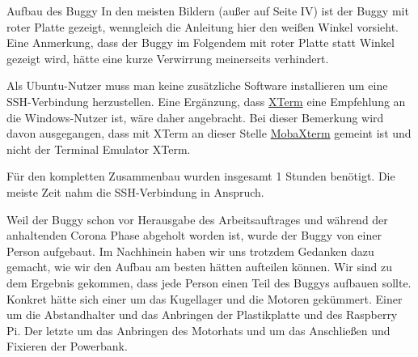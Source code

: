\documentclass[12pt,twoside]{report}
\begin{document}
\begin{section}{Aufbau des Buggy}
In den meisten Bildern (außer auf Seite IV) ist der Buggy mit roter Platte gezeigt, wenngleich die Anleitung hier den weißen Winkel vorsieht. Eine Anmerkung, dass der Buggy im Folgendem mit roter Platte statt Winkel gezeigt wird, hätte eine kurze Verwirrung meinerseits verhindert.

Als Ubuntu-Nutzer muss man keine zusätzliche Software installieren um eine SSH-Verbindung herzustellen. Eine Ergänzung, dass \href{https://invisible-island.net/xterm/}{XTerm} eine Empfehlung an die Windows-Nutzer ist, wäre daher angebracht. Bei dieser Bemerkung wird davon ausgegangen, dass mit XTerm an dieser Stelle \href{https://mobaxterm.mobatek.net/}{MobaXterm} gemeint ist und nicht der Terminal Emulator XTerm. 

Für den kompletten Zusammenbau wurden insgesamt 1 Stunden benötigt. Die meiste Zeit nahm die SSH-Verbindung in Anspruch.

Weil der Buggy schon vor Herausgabe des Arbeitsauftrages und während der anhaltenden Corona Phase abgeholt worden ist, wurde der Buggy von einer Person aufgebaut. Im Nachhinein haben wir uns trotzdem Gedanken dazu gemacht, wie wir den Aufbau am besten hätten aufteilen können. Wir sind zu dem Ergebnis gekommen, dass jede Person einen Teil des Buggys aufbauen sollte. Konkret hätte sich einer um das Kugellager und die Motoren gekümmert. Einer um die Abstandhalter und das Anbringen der Plastikplatte und des Raspberry Pi. Der letzte um das Anbringen des Motorhats und um das Anschließen und Fixieren der Powerbank.

\end{section}
\end{document}
